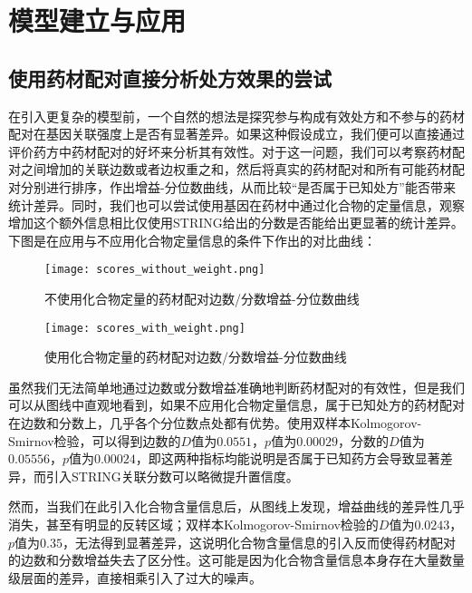 
\chapter{模型建立与应用}

\section{使用药材配对直接分析处方效果的尝试}

在引入更复杂的模型前，一个自然的想法是探究参与构成有效处方和不参与的药材配对在基因关联强度上是否有显著差异。如果这种假设成立，我们便可以直接通过评价药方中药材配对的好坏来分析其有效性。对于这一问题，我们可以考察药材配对之间增加的关联边数或者边权重之和，然后将真实的药材配对和所有可能药材配对分别进行排序，作出增益-分位数曲线，从而比较“是否属于已知处方”能否带来统计差异。同时，我们也可以尝试使用基因在药材中通过化合物的定量信息，观察增加这个额外信息相比仅使用STRING给出的分数是否能给出更显著的统计差异。下图是在应用与不应用化合物定量信息的条件下作出的对比曲线：

\begin{figure}[H]
  \centering
  \texttt{[image: scores\_without\_weight.png]}
  \caption{不使用化合物定量的药材配对边数/分数增益-分位数曲线}
  \label{fig:score_without_weight}
\end{figure}

\begin{figure}[H]
  \centering
  \texttt{[image: scores\_with\_weight.png]}
  \caption{使用化合物定量的药材配对边数/分数增益-分位数曲线}
  \label{fig:scores_with_weight}
\end{figure}


虽然我们无法简单地通过边数或分数增益准确地判断药材配对的有效性，但是我们可以从图线中直观地看到，如果不应用化合物定量信息，属于已知处方的药材配对在边数和分数上，几乎各个分位数点处都有优势。使用双样本Kolmogorov-Smirnov检验，可以得到边数的$D$值为$0.0551$，$p$值为$0.00029$，分数的$D$值为$0.05556$，$p$值为$0.00024$，即这两种指标均能说明是否属于已知药方会导致显著差异，而引入STRING关联分数可以略微提升置信度。

然而，当我们在此引入化合物含量信息后，从图线上发现，增益曲线的差异性几乎消失，甚至有明显的反转区域；双样本Kolmogorov-Smirnov检验的$D$值为$0.0243$，$p$值为$0.35$，无法得到显著差异，这说明化合物含量信息的引入反而使得药材配对的边数和分数增益失去了区分性。这可能是因为化合物含量信息本身存在大量数量级层面的差异，直接相乘引入了过大的噪声。

